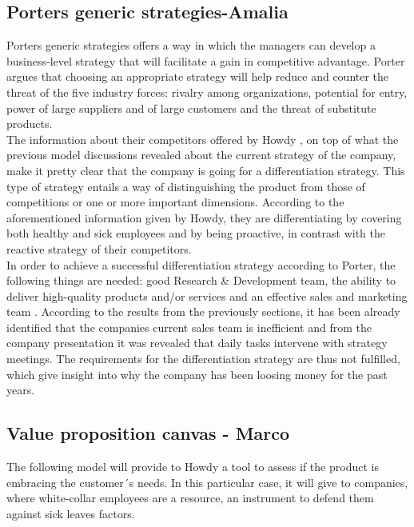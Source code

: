 \subsection{Porters generic strategies-Amalia}
Porters generic strategies offers a way in which the managers can develop a business-level strategy that will facilitate a gain in competitive advantage\cite[p.190]{jones_george_2013}. Porter argues that choosing an appropriate strategy will help reduce and counter the threat of the five industry forces: rivalry among organizations, potential for entry, power of large suppliers and of large customers and the threat of substitute products\cite[p.189-190]{jones_george_2013}.\\
\noindent The information about their competitors offered by Howdy \cite{Extrainfo}, on top of what the previous model discussions revealed about the current strategy of the company, make it pretty clear that the company is going for a differentiation strategy. This type of strategy entails a way of distinguishing the product from those of competitions or one or more important dimensions\cite[p.191]{jones_george_2013}. According to the aforementioned information given by Howdy, they are differentiating by covering both healthy and sick employees and by being proactive, in contrast with the reactive strategy of their competitors. \\
\noindent In order to achieve a successful differentiation strategy according to Porter, the following things are needed: good Research \& Development team, the ability to deliver high-quality products and/or services and an effective sales and marketing team \cite{mind_tools_porter}. According to the results from the previously sections, it has been already identified that the companies current sales team is inefficient and from the company presentation\cite[s.11]{oneofthepresentations} it was revealed that daily tasks intervene with strategy meetings. The requirements for the differentiation strategy are thus not  fulfilled, which give insight into why the company has been loosing money for the past years. 

\subsection{Value proposition canvas - Marco}

The following model will provide to Howdy a tool to assess if the product is embracing the customer´s needs. In this particular case, it will give to companies, where white-collar employees are a resource, an instrument to defend them against sick leaves factors.

